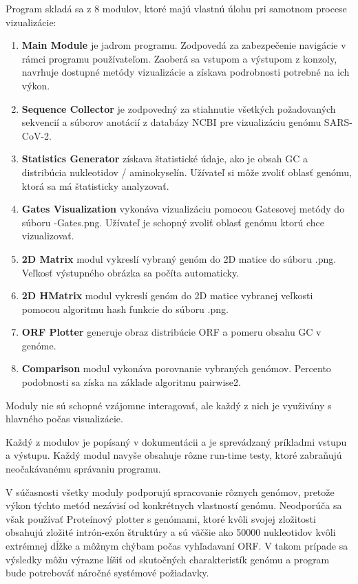 Program skladá sa z 8 modulov, ktoré majú vlastnú úlohu pri samotnom procese vizualizácie:
\begin{enumerate}
    \item \textbf{Main Module} je jadrom programu. Zodpovedá za zabezpečenie navigácie v rámci programu používateľom.
    Zaoberá sa vstupom a výstupom z konzoly, navrhuje dostupné metódy vizualizácie a získava podrobnosti potrebné na ich výkon.
    \item \textbf{Sequence Collector} je zodpovedný za stiahnutie všetkých požadovaných sekvencií a súborov anotácií z databázy NCBI pre vizualizáciu genómu SARS-CoV-2.
    \item \textbf{Statistics Generator} získava štatistické údaje, ako je obsah GC a distribúcia nukleotidov / aminokyselín.
    Užívateľ si môže zvoliť oblasť genómu, ktorá sa má štatisticky analyzovať.
    \item \textbf{Gates Visualization} vykonáva vizualizáciu pomocou Gatesovej metódy do súboru {\selectfont -Gates.png}.
    Užívateľ je schopný zvoliť oblasť genómu ktorú chce vizualizovať.
    \item \textbf{2D Matrix} modul vykreslí vybraný genóm do 2D matice do súboru .png. Veľkosť výstupného obrázka sa počíta automaticky.
    \item \textbf{2D HMatrix} modul vykreslí genóm do 2D matice vybranej veľkosti pomocou algoritmu hash funkcie do súboru .png.
    \item \textbf{ORF Plotter} generuje obraz distribúcie ORF a pomeru obsahu GC v genóme.
    \item \textbf{Comparison} modul vykonáva porovnanie vybraných genómov. Percento podobnosti sa získa na základe algoritmu pairwise2.
\end{enumerate}

Moduly nie sú schopné vzájomne interagovať, ale každý z nich je využivány s hlavného počas visualizácie.

Každý z modulov je popísaný v dokumentácii a je sprevádzaný príkladmi vstupu a výstupu.
Každý modul navyše obsahuje rôzne run-time testy, ktoré zabraňujú neočakávanému správaniu programu.

V súčasnosti všetky moduly podporujú spracovanie rôznych genómov, pretože výkon týchto metód nezávisí od konkrétnych vlastností genómu.
Neodporúča sa však používať Proteínový plotter s genómami, ktoré kvôli svojej zložitosti obsahujú zložité intrón-exón štruktúry a sú väčšie ako 50000 nukleotidov kvôli extrémnej dĺžke a môžnym chýbam počas vyhľadavaní ORF.
V takom prípade sa výsledky môžu výrazne líšiť od skutočných charakteristík genómu a program bude potrebováť náročné systémové požiadavky.